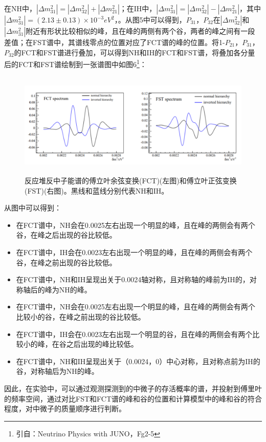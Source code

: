 \documentclass[10pt,a4paper]{article}
\begin{document}
在NH中，$|\Delta m_{31}^2|=|\Delta m_{32}^2|+|\Delta m_{21}^2|$；在IH中，$|\Delta m_{31}^2|=|\Delta m_{32}^2|-|\Delta m_{21}^2|$，其中$|\Delta m_{31}^2|=(2.13 \pm 0.13) \times 10^{-3}{eV}^2 $，。从图5中可以得到，$P_{31}$，$P_{32}$在$|\Delta m_{32}^2|$和$|\Delta m_{31}^2|$附近有形状比较相似的峰，且在峰的两侧有两个谷，两者的峰之间有一段差值；在FST谱中，其谱线零点的位置对应了FCT谱的峰的位置。将1-$P_{21}$，$P_{31}$，$P_{32}$的FCT和FST谱进行叠加，可以得到NH和IH的FCT和FST谱，将叠加各分量后的FCT和FST谱绘制到一张谱图中如图6\footnote{引自：Neutrino Physics with JUNO，Fg2-5}：
\begin{figure}[ht]
 \centering
 \includegraphics[height=5cm]{images/傅里叶图谱.png}
 \caption{反应堆反中子能谱的傅立叶余弦变换(FCT)(左图)和傅立叶正弦变换(FST)(右图)。黑线和蓝线分别代表NH和IH。}
 \label{fig:singleblock}
\end{figure}

从图中可以得到：
\begin{itemize}
	\item{在FCT谱中，NH会在0.0025左右出现一个明显的峰，且在峰的两侧会有两个谷，在峰之后出现的谷比较低。}
    \item{在FCT谱中，IH会在0.0023左右出现一个明显的峰，且在峰的两侧会有两个谷，在峰之前出现的谷比较低。}
    \item{在FCT谱中，NH和IH呈现出关于0.0024轴对称，且对称轴的峰前为IH的，对称轴后的峰为NH的峰。}
    \item{在FCT谱中，NH会在0.0025左右出现一个明显的峰，且在峰的两侧会有两个比较小的谷，在峰之前出现的谷比较低。}
    \item{在FCT谱中，IH会在0.0023左右出现一个明显的谷，且在峰的两侧会有两个比较小的峰，在谷之后出现的峰比较低。}
    \item{在FCT谱中，NH和IH呈现出关于（0.0024，0）中心对称，且对称点前为IH的谷，对称轴后为NH的峰。}
\end{itemize}

因此，在实验中，可以通过观测探测到的中微子的存活概率的谱，并投射到傅里叶的频率空间，通过对比FST和FCT谱的峰和谷的位置和计算模型中的峰和谷的符合程度，对中微子的质量顺序进行判断。
\end{document}

